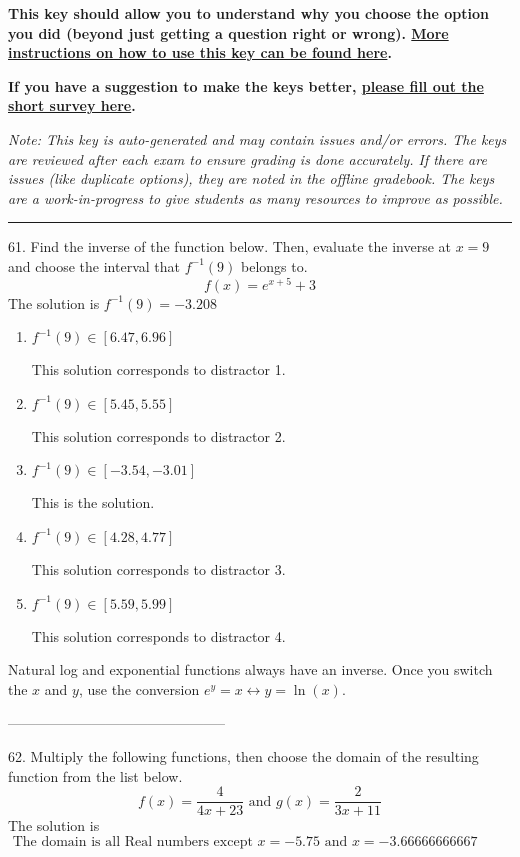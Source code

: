 \documentclass{extbook}[14pt]
\begin{document}
\textbf{This key should allow you to understand why you choose the option you did (beyond just getting a question right or wrong). \href{https://xronos.clas.ufl.edu/mac1105spring2020/courseDescriptionAndMisc/Exams/LearningFromResults}{More instructions on how to use this key can be found here}.}

\textbf{If you have a suggestion to make the keys better, \href{https://forms.gle/CZkbZmPbC9XALEE88}{please fill out the short survey here}.}

\textit{Note: This key is auto-generated and may contain issues and/or errors. The keys are reviewed after each exam to ensure grading is done accurately. If there are issues (like duplicate options), they are noted in the offline gradebook. The keys are a work-in-progress to give students as many resources to improve as possible.}

\rule{\textwidth}{0.4pt}

61. Find the inverse of the function below. Then, evaluate the inverse at $x = 9$ and choose the interval that $f^{-1}(9)$ belongs to.
\[ f(x) = e^{x+5}+3 \] 
The solution is $ f^{-1}(9) = -3.208 $ 

\begin{enumerate}[label=\Alph*.] 
\item $ f^{-1}(9) \in [6.47, 6.96] $ 

  This solution corresponds to distractor 1. 
\item $ f^{-1}(9) \in [5.45, 5.55] $ 

  This solution corresponds to distractor 2. 
\item $ f^{-1}(9) \in [-3.54, -3.01] $ 

  This is the solution. 
\item $ f^{-1}(9) \in [4.28, 4.77] $ 

  This solution corresponds to distractor 3. 
\item $ f^{-1}(9) \in [5.59, 5.99] $ 

  This solution corresponds to distractor 4. 
\end{enumerate} 
 
Natural log and exponential functions always have an inverse. Once you switch the $x$ and $y$, use the conversion $ e^y = x \leftrightarrow y=\ln(x)$.

-----------------------------------------------

62. Multiply the following functions, then choose the domain of the resulting function from the list below.
\[ f(x) = \frac{4}{4x+23} \text{ and } g(x) = \frac{2}{3x+11} \] 
The solution is $ \text{ The domain is all Real numbers except } x = -5.75 \text{ and } x = -3.66666666667 $ 
\end{document}
